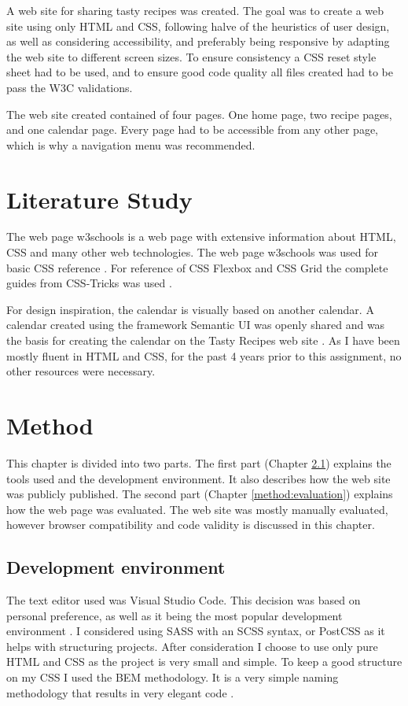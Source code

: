 \documentclass[a4paper]{scrartcl}
\begin{document}
A web site for sharing tasty recipes was created. The goal was to create a web site using only HTML and CSS, following halve of the heuristics of user design, as well as considering accessibility, and preferably being responsive by adapting the web site to different screen sizes. To ensure consistency a CSS reset style sheet had to be used, and to ensure good code quality all files created had to be pass the W3C validations.

The web site created contained of four pages. One home page, two recipe pages, and one calendar page. Every page had to be accessible from any other page, which is why a navigation menu was recommended.

\section{Literature Study}

The web page w3schools is a web page with extensive information about HTML, CSS and many other web technologies. The web page w3schools was used for basic CSS reference \cite{RefsnesData}. For reference of CSS Flexbox and CSS Grid the complete guides from CSS-Tricks was used \cite{Coyier,Coyiera}. 

For design inspiration, the calendar is visually based on another calendar. A calendar created using the framework Semantic UI was openly shared and was the basis for creating the calendar on the Tasty Recipes web site \cite{Nijin39} . As I have been mostly fluent in HTML and CSS, for the past 4 years prior to this assignment, no other resources were necessary.

\section{Method}
This chapter is divided into two parts. The first part (Chapter \ref{method:development}) explains the tools used and the development environment. It also describes how the web site was publicly published. The second part (Chapter \ref{method:evaluation}) explains how the web page was evaluated. The web site was mostly manually evaluated, however browser compatibility and code validity is discussed in this chapter.

\subsection{Development environment}
\label{method:development}

The text editor used was Visual Studio Code. This decision was based on personal preference, as well as it being the most popular development environment \cite{Stackoverflow}. I considered using SASS with an SCSS syntax, or PostCSS as it helps with structuring projects. After consideration I choose to use only pure HTML and CSS as the project is very small and simple. To keep a good structure on my CSS I used the BEM methodology. It is a very simple naming methodology that results in very elegant code \cite{Starkov}.
\end{document}
